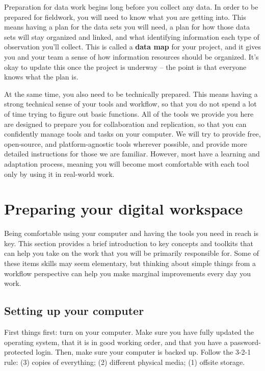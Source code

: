 
\begin{fullwidth}
Preparation for data work begins long before you collect any data.
In order to be prepared for fieldwork, you will need to know what you are getting into.
This means having a plan for the data sets you will need,
a plan for how those data sets will stay organized and linked,
and what identifying information each type of observation you'll collect.
This is called a \textbf{data map} for your project,
and it gives you and your team a sense of how information resources should be organized.
It's okay to update this once the project is underway --
the point is that everyone knows what the plan is.

At the same time, you also need to be technically prepared.
This means having a strong technical sense of your tools and workflow,
so that you do not spend a lot of time trying to figure out basic functions.
All of the tools we provide you here are designed to prepare you for collaboration and replication,
so that you can confidently manage tools and tasks on your computer.
We will try to provide free, open-source, and platform-agnostic tools wherever possible,
and provide more detailed instructions for those we are familiar.
However, most have a learning and adaptation process,
meaning you will become most comfortable with each tool
only by using it in real-world work.
\end{fullwidth}



\section{Preparing your digital workspace}

Being comfortable using your computer and having the tools you need in reach is key.
This section provides a brief introduction to key concepts and toolkits
that can help you take on the work that you will be primarily responsible for.
Some of these items skills may seem elementary,
but thinking about simple things from a workflow perspective
can help you make marginal improvements every day you work.

\subsection{Setting up your computer}

First things first: turn on your computer.
Make sure you have fully updated the operating system,
that it is in good working order,
and that you have a password-protected login.
Then, make sure your computer is backed up.
Follow the 3-2-1 rule:
(3) copies of everything;
(2) different physical media;
(1) offsite storage.

